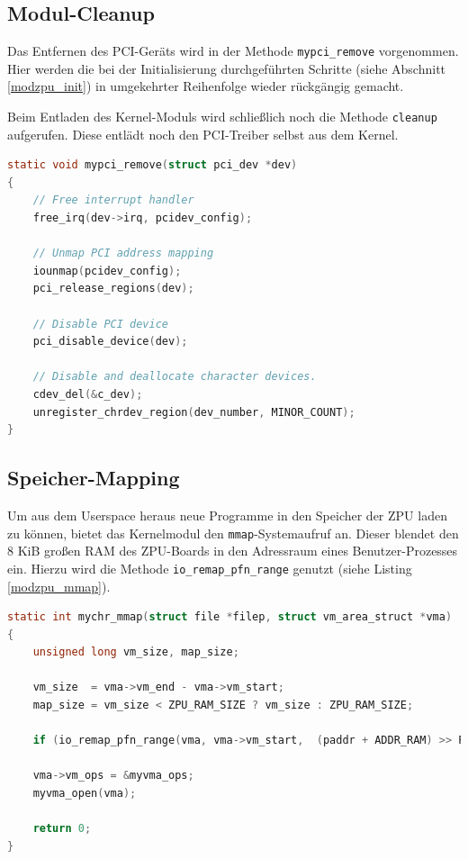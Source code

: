 \documentclass[11pt]{scrartcl}
\begin{document}
\subsection{Modul-Cleanup}

Das Entfernen des PCI-Geräts wird in der Methode \texttt{mypci\_remove} vorgenommen. Hier werden die bei der Initialisierung durchgeführten Schritte (siehe Abschnitt \ref{modzpu_init}) in umgekehrter Reihenfolge wieder rückgängig gemacht.

Beim Entladen des Kernel-Moduls wird schließlich noch die Methode \texttt{cleanup} aufgerufen. Diese entlädt noch den PCI-Treiber selbst aus dem Kernel.

\begin{lstlisting}[language=C, firstnumber=179, label=modzpu_cleanupfunc, caption=Entfernen des PCI-Geräts, float=btp]
static void mypci_remove(struct pci_dev *dev)
{
	// Free interrupt handler
	free_irq(dev->irq, pcidev_config);

	// Unmap PCI address mapping
	iounmap(pcidev_config);
	pci_release_regions(dev);

	// Disable PCI device
	pci_disable_device(dev);

	// Disable and deallocate character devices.
	cdev_del(&c_dev);
	unregister_chrdev_region(dev_number, MINOR_COUNT);
}
\end{lstlisting}

\subsection{Speicher-Mapping}

Um aus dem Userspace heraus neue Programme in den Speicher der ZPU laden zu können, bietet das Kernelmodul den \texttt{mmap}-Systemaufruf an. Dieser blendet den 8 KiB großen RAM des ZPU-Boards in den Adressraum eines Benutzer-Prozesses ein. Hierzu wird die Methode \texttt{io\_remap\_pfn\_range} genutzt (siehe Listing \ref{modzpu_mmap}).

\begin{lstlisting}[language=C, firstnumber=9, label=modzpu_mmap, caption=Implementierung der mmap-Funktion,float=btp]
static int mychr_mmap(struct file *filep, struct vm_area_struct *vma)
{
	unsigned long vm_size, map_size;

	vm_size  = vma->vm_end - vma->vm_start;
	map_size = vm_size < ZPU_RAM_SIZE ? vm_size : ZPU_RAM_SIZE;
	
	if (io_remap_pfn_range(vma, vma->vm_start,  (paddr + ADDR_RAM) >> PAGE_SHIFT,  map_size,  vma->vm_page_prot) != 0) return -EAGAIN;

	vma->vm_ops = &myvma_ops;
	myvma_open(vma);

	return 0;
}
\end{lstlisting}
\end{document}
